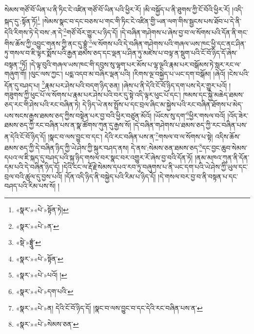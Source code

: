 སེམས་གཙོ་བོ་ཡིན་པ་ནི་ཏིང་ངེ་འཛིན་གཙོ་བོ་ཡིན་པའི་ཕྱིར་རོ། །མི་བསྐྱོད་པ་ནི་ཐུགས་ཀྱི་ངོ་བོའི་ཕྱིར་རོ། །འདི་སྐད་དུ་:སྟོན་ཏོ།\footnote{«སྣར་»«པེ་»སྟོན་ཏེ།} །སེམས་སྣང་བ་དང་བཅས་པ་གང་གི་ཏིང་ངེ་འཛིན་གྱི་ཡན་ལག་གིས་སྦྱངས་པས་ཐོབ་པ་དེ་ནི་དེའི་རིགས་ཏེ་དེ་བས་:ན་དེ་\footnote{«སྣར་»«པེ་»ན་}གཙོ་བོར་གྱུར་པ་ཉིད་དོ། །དེ་བཞིན་གཤེགས་པ་ཞེས་བྱ་བ་ལ་སོགས་པའི་དོན་ནི་གང་གིས་ཆོས་ཀྱི་འབྱུང་གནས་ཀྱི་ནང་དུ་བྷྲུཾ་\footnote{«སྡེ་»བྷྲཱུཾ་}ལ་སོགས་པའི་དེ་བཞིན་གཤེགས་པའི་གཞལ་ཡས་ཁང་ཕྱི་དང་ནང་ཤིན་ཏུ་གསལ་བ་ཇི་ལྟར་སྨོས་པའི་རྒྱན་ཐམས་ཅད་དང་ལྡན་པ་ཤིན་ཏུ་མཛེས་པ་བལྟ་ན་སྡུག་པའི་ངོ་བོ་ཉིད་དོ་ཞེས་བསྟན་\footnote{«སྣར་»«པེ་»སྟོན་}ཏོ། །དེ་ལྟ་བུའི་གཞལ་ཡས་ཁང་གི་དབུས་སུ་ལྷག་པར་མོས་པ་ལྷ་ལྔའི་རྣམ་པར་བསྒོམས་ཏེ་སླར་རང་ལ་གཞུག་གོ། །ལུང་ལས་ཀྱང་། པདྨ་འདབ་མ་བཞིར་ལྡན་པའི། །རིགས་ལྔ་བསྐྱེད་པ་ཡང་དག་བསྒོམ། །ཞེའོ། །ངེས་པའི་དོན་དུ་བཤད་པ། \footnote{«སྣར་»«པེ་»པའོ། ། }རྣམ་པར་ཤེས་པའི་བདག་ཉིད་ཅན། །ཞེས་པ་ནི་དེའི་ངོ་བོ་ཉིད་དག་པས་དེར་གྱུར་པའོ། །གཟུགས་ཀྱི་ཕུང་པོ་ལ་སོགས་པ་རྣམ་པར་ཤེས་པའི་བར་དུ་སྟེ་འདི་ལྟར་ཕུང་པོ་དང་། ཁམས་དང་སྐྱེ་མཆེད་ཐམས་ཅད་རང་གི་ཤེས་པའི་རང་བཞིན་ཏེ། དེ་ཉིད་ཡེ་ནས་སྤྲོས་པ་དང་བྲལ་ཞིང་མ་སྐྱེས་པའི་རང་བཞིན་ཐོགས་པ་མེད་པས་སངས་རྒྱས་ཐམས་ཅད་ཀྱིས་བསྟེན་པར་བྱ་བའི་ཕྱིར་བཙུན་མོའོ། །ཡོངས་སུ་དག་\footnote{«སྣར་»«པེ་»དག་པའི་}ཕྱིར་གསལ་བའོ། །འོད་ཟེར་ཐམས་ཅད་ཀྱི་རང་བཞིན་པས་ན་སྣ་ཚོགས་ཀུན་དུ་རྒྱས་སོ། །དེ་བཞིན་གཤེགས་པ་ཐམས་ཅད་ཀྱི་རང་བཞིན་པས་ན་དེའི་ངོ་བོ་ཉིད་དོ། །སྣང་བ་ལས་བྱུང་བ་དང་། དེའི་རང་བཞིན་པས་ན་\footnote{«སྣར་»«པེ་»ན། དེའི་ངོ་བོ་ཉིད་དོ། །སྣང་བ་ལས་བྱུང་བ་དང་དེའི་རང་བཞིན་པས་ན་}གསལ་བ་ལ་སོགས་པ་སྟེ། འདིས་ཆོས་ཐམས་ཅད་ཀྱི་དེ་བཞིན་ཉིད་ཀྱི་ཡེ་ཤེས་ཀྱི་སྐུར་བཤད་ནས། དེ་ནས་:སེམས་ཅན་ཐམས་ཅད་\footnote{«སྣར་»«པེ་»སེམས་ཅན་}དང་བྱང་ཆུབ་སེམས་དཔའ་ལ་ཇི་སྐད་དུ་བཤད་པའི་སྐུ་ཉིད་གསལ་བར་སྣང་བར་འགྱུར་རོ་ཞེས་བྱ་བའི་དོན་ཏོ། །ནམ་མཁའ་ཀུན་ནི་དོན་དམ་པའི་དེ་བཞིན་ཉིད་དོ། །དེའི་ངང་ལ་རྡོ་རྗེ་སེམས་དཔའ་རབ་ཏུ་བཞུགས་པ་ནི་ཡང་དག་པའི་ཡེ་ཤེས་ཀྱི་ཡུལ་དང་བྲལ་བའི་ཚུལ་དུ་བྱས་པའོ། །དོན་འདི་ཉིད་ནི་བསྐྱེད་པའི་རིམ་པ་ཉིད་དོ། །དེ་གསལ་བར་བྱ་བ་ནི་བསྟན་པ་དང་བཤད་པའི་རིམ་པས་སོ། །
